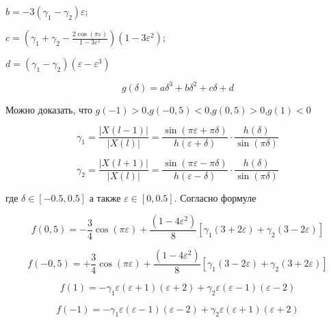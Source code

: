 $b = -3(\gamma_1 - \gamma_2)\varepsilon$;

$c = \left( \gamma_1 + \gamma_2 - \frac{2 \cos(\pi \varepsilon)}{1-3\varepsilon^2}
\right) \left( {1-3\varepsilon^2} \right) $;

$d = ( \gamma_1 - \gamma_2)(\varepsilon - \varepsilon^3)$

\begin{equation}
	\label{eq:equation35}
	g(\delta) = {a \delta}^3 + {b \delta}^2 + c \delta + d
\end{equation}

Можно доказать, что $g(-1)>0$,$g(-0,5)<0$,$g(0,5)>0$,$g(1)<0$ 

\begin{equation}
	\label{eq:equation36}
	\gamma_1 = \frac{\left| X(l-1)\right|}{\left| X(l)\right|} = \frac{\sin({\pi \varepsilon + \pi \delta})}{h(\varepsilon + \delta)} \cdot \frac{h(\delta)}{\sin(\pi \delta)}
\end{equation}

\begin{equation}
	\label{eq:equation37}
	\gamma_2 = \frac{\left| X(l+1)\right|}{\left| X(l)\right|} = \frac{\sin({\pi \varepsilon - \pi \delta})}{h(\varepsilon - \delta)} \cdot \frac{h(\delta)}{\sin(\pi \delta)}
\end{equation}

где $\delta \in[-0.5,0.5]$ а также $\varepsilon\in[0,0.5]$. Согласно формуле 

\begin{equation}
	\label{eq:equation38}
	f(0,5) = -\frac{3}{4} \cos(\pi \varepsilon) + \frac{(1-4 \varepsilon^2)}{8} \left[ {\gamma_1 (3+2 \varepsilon)+\gamma_2 (3-2 \varepsilon)}\right] 
\end{equation}

\begin{equation}
	\label{eq:equation39}
	f(-0,5) = +\frac{3}{4} \cos(\pi \varepsilon) + \frac{(1-4 \varepsilon^2)}{8} \left[ {\gamma_1 (3-2 \varepsilon)+\gamma_2 (3+2 \varepsilon)}\right] 
\end{equation}

\begin{equation}
	\label{eq:equation40}
	f(1) = -\gamma_1 \varepsilon(\varepsilon+1)(\varepsilon + 2) + \gamma_2 \varepsilon(\varepsilon-1)(\varepsilon - 2)
\end{equation}

\begin{equation}
	\label{eq:equation41}
	f(-1) = -\gamma_1 \varepsilon(\varepsilon-1)(\varepsilon - 2) + \gamma_2 \varepsilon(\varepsilon+1)(\varepsilon + 2)
\end{equation}

